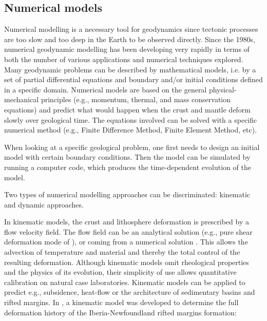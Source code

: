 \subsection*{Numerical models}

Numerical modelling is a necessary tool for geodynamics since tectonic processes are too slow and too deep in the Earth to be observed directly. Since the 1980s, numerical geodynamic modelling has been developing very rapidly in terms of both the number of various applications and numerical techniques explored. Many geodynamic problems can be described by mathematical models, i.e. by a set of partial differential equations and boundary and/or initial conditions defined in a specific domain. Numerical models are based on the general physical-mechanical principles (e.g., momentum, thermal, and mass conservation equations) and predict what would happen when the crust and mantle deform slowly over geological time. The equations involved can be solved with a specific numerical method (e.g., Finite Difference Method, Finite Element Method, etc). 

When looking at a specific geological problem, one first needs to design an initial model with certain boundary conditions. Then the model can be simulated by running a computer code, which produces the time-dependent evolution of the model. 

Two types of numerical modelling approaches can be discriminated: kinematic and dynamic approaches. 

In kinematic models, the crust and lithosphere deformation is prescribed by a flow velocity field. The flow field can be an analytical solution (e.g., pure shear deformation mode of \cite{mcke78}), or coming from a numerical solution \cite{jekm16}. This allows the advection of temperature and material and thereby the total control of the resulting deformation. Although kinematic models omit rheological properties and the physics of its evolution, their simplicity of use allows quantitative calibration on natural case laboratories. Kinematic models can be applied to predict e.g., subsidence, heat-flow or the architecture of sedimentary basins and rifted margins. In \cite{jekm16}, a kinematic model was developed to determine the full deformation history of the Iberia-Newfoundland rifted margins formation: 

